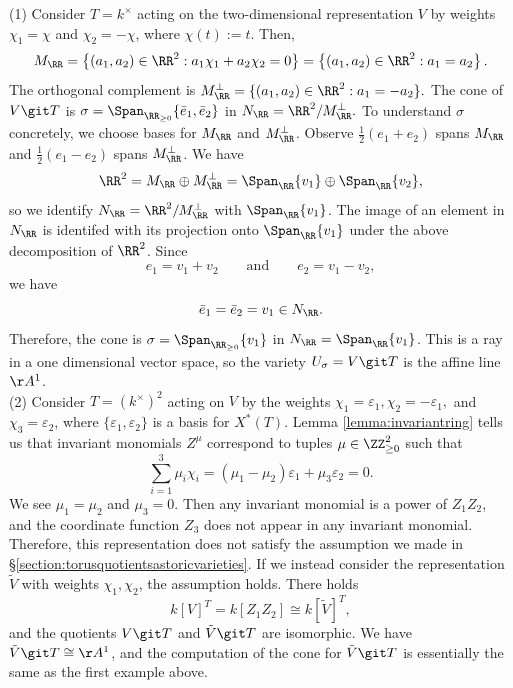 \documentclass[12pt]{amsart}
\theoremstyle{plain}
\theoremstyle{definition}
\begin{document}
(1) 
Consider $T = k^\times$ acting on the two-dimensional representation $V$ by weights $\chi_1 = \chi$ and $\chi_2 = - \chi$, where $\chi(t) := t$.
Then,
$$M_\RR = \left\{(a_1, a_2) \in \RR^2 : a_1 \chi_1 + a_2 \chi_2 = 0\right\} = \left\{(a_1, a_2) \in \RR^2 : a_1 = a_2 \right\} .$$
The orthogonal complement is $M_\RR^\perp = \{(a_1, a_2) \in \RR^2 : a_1 = - a_2\}.$
The cone of $V \git T$ is $\sigma = \Span_{\RR_{\ge 0}}\{\bar e_1, \bar e_2\}$ in $N_\RR = \RR^2 / M_\RR^\perp.$
To understand $\sigma$ concretely, we choose bases for $M_\RR$ and $M_\RR^\perp$.
Observe $\frac{1}{2}(e_1+e_2)$ spans $M_\RR$ and $\frac{1}{2}(e_1-e_2)$ spans $M_\RR^\perp$.
We have
$$\RR^2 = M_\RR \oplus M_\RR^\perp = \Span_\RR \{v_1\} \oplus \Span_\RR\{v_2\},$$
so we identify $N_\RR = \RR^2 / M_\RR^\perp$ with $\Span_\RR\{v_1\}$.
The image of an element in $N_\RR$ is identifed with its projection onto $\Span_\RR\{v_1\}$ under the above decomposition of $\RR^2$.
Since
$$e_1 = v_1 + v_2 \qquad\text{and}\qquad e_2 = v_1 - v_2,$$
we have
$$\bar e_1 = \bar e_2 = v_1 \in N_\RR.$$
Therefore, the cone is $\sigma = \Span_{\RR_{\ge 0}}\{v_1\}$ in $N_\RR = \Span_{\RR}\{v_1\}$.
This is a ray in a one dimensional vector space, so the variety $U_\sigma = V \git T$ is the affine line $\AA^1$. \\

(2) 
Consider $T = (k^\times)^2$ acting on $V$ by the weights $\chi_1 = \varepsilon_1, \chi_2 = - \varepsilon_1,$ and $\chi_3 = \varepsilon_2$, where $\{\varepsilon_1, \varepsilon_2\}$ is a basis for $X^*(T)$. 
Lemma \ref{lemma:invariantring} tells us that invariant monomials $Z^\mu$ correspond to tuples $\mu \in \ZZ_{\ge 0}^2$ such that 
$$\sum_{i=1}^3 \mu_i \chi_i = (\mu_1 - \mu_2) \varepsilon_1 + \mu_3 \varepsilon_2 = 0.$$
We see $\mu_1 = \mu_2$ and $\mu_3 = 0$.
Then any invariant monomial is a power of $Z_1 Z_2$, and the coordinate function $Z_3$ does not appear in any invariant monomial.
Therefore, this representation does not satisfy the assumption we made in \S \ref{section:torusquotientsastoricvarieties}.
If we instead consider the representation $\tilde V$ with weights $\chi_1, \chi_2$, the assumption holds.
There holds
$$k[V]^T = k[Z_1 Z_2] \cong k[\tilde V]^T,$$
and the quotients $V \git T$ and $\tilde V \git T$ are isomorphic.
We have $\tilde V \git T \cong \AA^1$, and the computation of the cone for $\tilde V \git T$ is essentially the same as the first example above. \\
\end{document}
